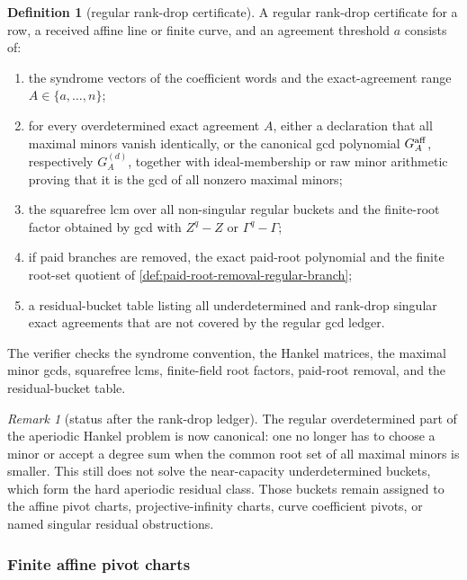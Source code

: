 \documentclass[11pt]{article}
\theoremstyle{definition}
\newtheorem{definition}[theorem]{Definition}
\theoremstyle{remark}
\newtheorem{remark}[theorem]{Remark}
\begin{document}
\begin{definition}[regular rank-drop certificate]
\label{def:regular-rankdrop-certificate}
A regular rank-drop certificate for a row, a received affine line or finite
curve, and an agreement threshold $a$ consists of:
\begin{enumerate}[label=\textup{(\roman*)},leftmargin=2.2em]
\item the syndrome vectors of the coefficient words and the exact-agreement range
$A\in\{a,\ldots,n\}$;
\item for every overdetermined exact agreement $A$, either a declaration that all
maximal minors vanish identically, or the canonical gcd polynomial
$G_A^{\rm aff}$, respectively $G_A^{(d)}$, together with ideal-membership or raw
minor arithmetic proving that it is the gcd of all nonzero maximal minors;
\item the squarefree lcm over all non-singular regular buckets and the finite-root
factor obtained by gcd with $Z^q-Z$ or $\Gamma^q-\Gamma$;
\item if paid branches are removed, the exact paid-root polynomial and the finite
root-set quotient of \cref{def:paid-root-removal-regular-branch};
\item a residual-bucket table listing all underdetermined and rank-drop singular
exact agreements that are not covered by the regular gcd ledger.
\end{enumerate}
The verifier checks the syndrome convention, the Hankel matrices, the maximal
minor gcds, squarefree lcms, finite-field root factors, paid-root removal, and the
residual-bucket table.
\end{definition}

\begin{remark}[status after the rank-drop ledger]
\label{rem:rankdrop-ledger-status}
The regular overdetermined part of the aperiodic Hankel problem is now canonical:
one no longer has to choose a minor or accept a degree sum when the common root
set of all maximal minors is smaller.  This still does not solve the near-capacity
underdetermined buckets, which form the hard aperiodic residual class.
Those buckets remain assigned to the affine pivot charts, projective-infinity
charts, curve coefficient pivots, or named singular residual obstructions.
\end{remark}

\subsubsection{Finite affine pivot charts}
\end{document}
